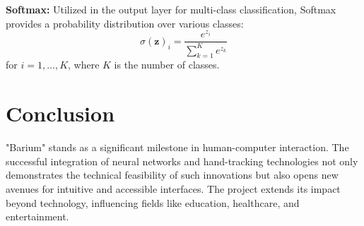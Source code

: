 \documentclass{article}
\begin{document}
\textbf{Softmax:} Utilized in the output layer for multi-class classification, Softmax provides a probability distribution over various classes:
\begin{equation}
\sigma(\mathbf{z})_i = \frac{e^{z_i}}{\sum_{k=1}^{K} e^{z_k}}
\end{equation}
for \( i = 1, \ldots, K \), where \( K \) is the number of classes.



\section{Conclusion}
"Barium" stands as a significant milestone in human-computer interaction. The successful integration of neural networks and hand-tracking technologies not only demonstrates the technical feasibility of such innovations but also opens new avenues for intuitive and accessible interfaces. The project extends its impact beyond technology, influencing fields like education, healthcare, and entertainment.



\end{document}
